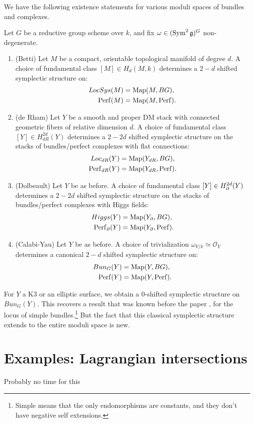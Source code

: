We have the following existence statements for various moduli spaces of bundles and complexes.
\begin{cor}
\label{cor:symp_moduli}
Let $G$ be a reductive group scheme over $k$, and fix $\omega \in (\operatorname{Sym}^2 \mathfrak g) ^G$ non-degenerate.
\begin{enumerate}
\item (Betti) Let $M$ be a compact, orientable topological manifold of degree $d$. A choice of fundamental class $[M] \in H_d(M,k)$
determines a $2-d$ shifted symplectic structure on:
\begin{align*}
LocSys(M) &= \operatorname{Map}(M,BG), \\
\mathrm{Perf}(M) &= \operatorname{Map}(M, \mathrm{Perf}) .
\end{align*}

\item (de Rham) Let $Y$ be a smooth and proper DM stack with connected geometric fibers of relative dimension $d$. A choice of
fundamental class $[Y] \in H^{2d}_{dR}(Y)$ determines a $2-2d$ shifted symplectic structure on the stacks of bundles/perfect
complexes with flat connections:
\begin{align*}
Loc_{dR}(Y) &= \operatorname{Map}(Y_{dR},BG), \\
\mathrm{Perf}_{dR}(Y) &= \operatorname{Map}(Y_{dR}, \mathrm{Perf}) .
\end{align*}

\item (Dolbeault) Let $Y$ be as before. A choice of
fundamental class $[Y] \in H^{2d}_{\partial}(Y)$ determines a $2-2d$ shifted symplectic structure on the stacks of bundles/perfect
complexes with Higgs fields:
\begin{align*}
Higgs(Y) &= \operatorname{Map}(Y_{\partial},BG), \\
\mathrm{Perf}_{\partial}(Y) &= \operatorname{Map}(Y_{\partial}, \mathrm{Perf}) .
\end{align*}

\item (Calabi-Yau) Let $Y$ be as before. A choice of trivialization $\omega_{Y/k} \simeq \mathcal{O}_Y$ determines a canonical
$2-d$ shifted symplectic structure on:
\begin{align*}
Bun_G(Y) &= \operatorname{Map}(Y,BG), \\
\mathrm{Perf}(Y) &= \operatorname{Map}(Y, \mathrm{Perf}) .
\end{align*}
\end{enumerate}
\end{cor}

\begin{rem}
For $Y$ a K3 or an elliptic surface, we obtain a 0-shifted symplectic structure on $Bun_G(Y)$. This recovers
a result that was known before the paper \cite{PTVV}, for the locus of simple bundles.\footnote{Simple means that the
only endomorphisms are constants, and they don't have negative self extensions.} But the fact that this classical 
symplectic structure extends to the entire moduli space
is new.
\end{rem}



\section{Examples: Lagrangian intersections}
Probably no time for this

